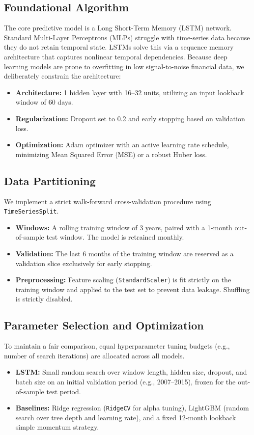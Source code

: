 \documentclass[a4paper,oneside]{scrbook}
\begin{document}
\subsection{Foundational Algorithm}
The core predictive model is a Long Short-Term Memory (LSTM) network. Standard Multi-Layer Perceptrons (MLPs) struggle with time-series data because they do not retain temporal state. LSTMs solve this via a sequence memory architecture that captures nonlinear temporal dependencies.
Because deep learning models are prone to overfitting in low signal-to-noise financial data, we deliberately constrain the architecture:
\begin{itemize}
    \item \textbf{Architecture:} 1 hidden layer with 16--32 units, utilizing an input lookback window of 60 days.
    \item \textbf{Regularization:} Dropout set to 0.2 and early stopping based on validation loss.
    \item \textbf{Optimization:} Adam optimizer with an active learning rate schedule, minimizing Mean Squared Error (MSE) or a robust Huber loss.
\end{itemize}

\subsection{Data Partitioning}
We implement a strict walk-forward cross-validation procedure using \texttt{TimeSeriesSplit}.
\begin{itemize}
    \item \textbf{Windows:} A rolling training window of 3 years, paired with a 1-month out-of-sample test window. The model is retrained monthly.
    \item \textbf{Validation:} The last 6 months of the training window are reserved as a validation slice exclusively for early stopping.
    \item \textbf{Preprocessing:} Feature scaling (\texttt{StandardScaler}) is fit strictly on the training window and applied to the test set to prevent data leakage. Shuffling is strictly disabled.
\end{itemize}

\subsection{Parameter Selection and Optimization}
To maintain a fair comparison, equal hyperparameter tuning budgets (e.g., number of search iterations) are allocated across all models. 
\begin{itemize}
    \item \textbf{LSTM:} Small random search over window length, hidden size, dropout, and batch size on an initial validation period (e.g., 2007–2015), frozen for the out-of-sample test period.
    \item \textbf{Baselines:} Ridge regression (\texttt{RidgeCV} for alpha tuning), LightGBM (random search over tree depth and learning rate), and a fixed 12-month lookback simple momentum strategy.
\end{itemize}
\end{document}
